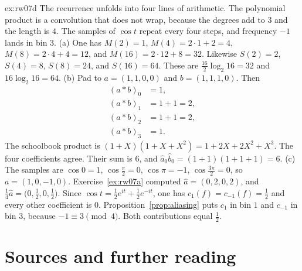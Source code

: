 \begin{solution}{ex:rw07d}
\idea The recurrence unfolds into four lines of arithmetic. The polynomial product is a convolution that does not wrap, because the degrees add to $3$ and the length is $4$. The samples of $\cos t$ repeat every four steps, and frequency $-1$ lands in bin $3$.
\writeup (a) One has $M(2)=1$, $M(4)=2\cdot1+2=4$, $M(8)=2\cdot4+4=12$, and $M(16)=2\cdot12+8=32$. Likewise $S(2)=2$, $S(4)=8$, $S(8)=24$, and $S(16)=64$. These are $\frac{16}2\log_2 16=32$ and $16\log_2 16=64$.
(b) Pad to $a=(1,1,0,0)$ and $b=(1,1,1,0)$. Then
\[
\begin{aligned}
(a*b)_0&=1,\\
(a*b)_1&=1+1=2,\\
(a*b)_2&=1+1=2,\\
(a*b)_3&=1.
\end{aligned}
\]
The schoolbook product is $(1+X)(1+X+X^2)=1+2X+2X^2+X^3$. The four coefficients agree. Their sum is $6$, and $\hat a_0\hat b_0=(1+1)(1+1+1)=6$.
(c) The samples are $\cos0=1$, $\cos\frac\pi2=0$, $\cos\pi=-1$, $\cos\frac{3\pi}2=0$, so $a=(1,0,-1,0)$. Exercise~\ref{ex:rw07a} computed $\hat a=(0,2,0,2)$, and $\frac14\hat a=\bigl(0,\frac12,0,\frac12\bigr)$. Since $\cos t=\frac12 e^{it}+\frac12 e^{-it}$, one has $c_1(f)=c_{-1}(f)=\frac12$ and every other coefficient is $0$. Proposition~\ref{prop:aliasing} puts $c_1$ in bin $1$ and $c_{-1}$ in bin $3$, because $-1\equiv3\pmod4$. Both contributions equal $\frac12$.
\end{solution}

\section*{Sources and further reading}

